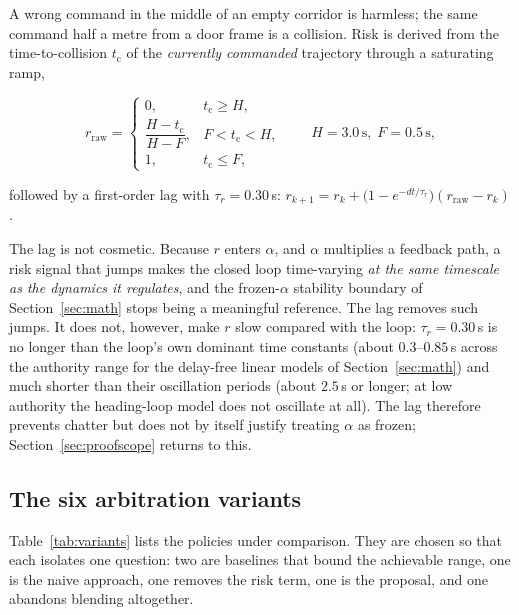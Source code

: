 \documentclass[11pt,a4paper]{article}
\newcommand{\ttc}{t_{\mathrm{c}}}
\theoremstyle{plain}
\theoremstyle{definition}
\begin{document}
A wrong command in the middle of an empty corridor is harmless; the same
command half a metre from a door frame is a collision. Risk is derived
from the time-to-collision $\ttc$ of the \emph{currently commanded}
trajectory through a saturating ramp,

\begin{equation}
r_{\mathrm{raw}} =
\begin{cases}
0, & \ttc \ge H,\\[2pt]
\dfrac{H - \ttc}{H - F}, & F < \ttc < H,\\[6pt]
1, & \ttc \le F,
\end{cases}
\qquad H = 3.0\,\mathrm{s},\; F = 0.5\,\mathrm{s},
\label{eq:risk}
\end{equation}

followed by a first-order lag with $\tau_r = 0.30$\,s:
$r_{k+1} = r_k + \bigl(1 - e^{-dt/\tau_r}\bigr)(r_{\mathrm{raw}} - r_k)$.

The lag is not cosmetic. Because $r$ enters $\alpha$, and $\alpha$
multiplies a feedback path, a risk signal that jumps makes the closed
loop time-varying \emph{at the same timescale as the dynamics it
regulates}, and the frozen-$\alpha$ stability boundary of
Section~\ref{sec:math} stops being a meaningful reference. The lag removes
such jumps. It does not, however, make $r$ slow compared with the loop:
$\tau_r = 0.30$\,s is no longer than the loop's own dominant time
constants (about $0.3$--$0.85$\,s across the authority range for the
delay-free linear models of Section~\ref{sec:math}) and much shorter
than their oscillation periods (about $2.5$\,s or longer; at low
authority the heading-loop model does not oscillate at all). The lag
therefore prevents chatter but does not by itself justify treating
$\alpha$ as frozen; Section~\ref{sec:proofscope} returns to this.

\subsection{The six arbitration variants}

Table~\ref{tab:variants} lists the policies under comparison. They are
chosen so that each isolates one question: two are baselines that bound
the achievable range, one is the naive approach, one removes the risk
term, one is the proposal, and one abandons blending altogether.
\end{document}
